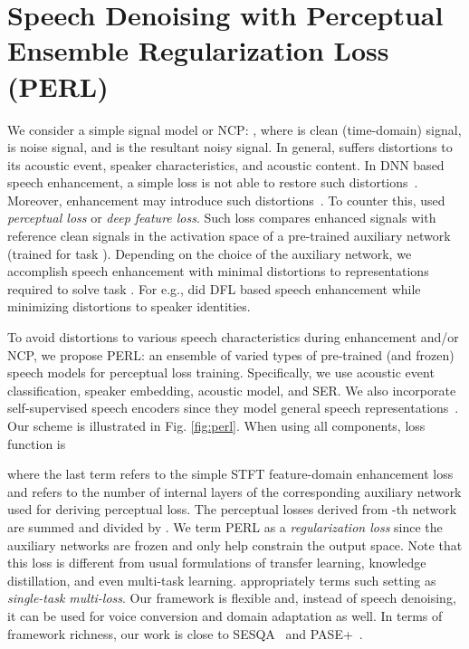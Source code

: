 \documentclass{article}
\begin{document}
\section{Speech Denoising with Perceptual Ensemble Regularization Loss (PERL)}
\label{sec:perl}
We consider a simple signal model or \ac{NCP}: , where  is clean (time-domain) signal,  is noise signal, and  is the resultant noisy signal.
In general,  suffers distortions to its acoustic event, speaker characteristics, and acoustic content.
In \ac{DNN} based speech enhancement, a simple  loss is not able to restore such distortions~\cite{kataria2020analysis}.
Moreover, enhancement may introduce such distortions~\cite{kataria2020analysis}.
To counter this, \cite{germain2018speech,kataria2020analysis} used \emph{perceptual loss} or \emph{deep feature loss}.
Such loss compares enhanced signals with reference clean signals in the activation space of a pre-trained auxiliary network (trained for task ).
Depending on the choice of the auxiliary network, we accomplish speech enhancement with minimal distortions to representations required to solve task .
For e.g., \cite{kataria2020analysis} did \ac{DFL} based speech enhancement while minimizing distortions to speaker identities.

To avoid distortions to various speech characteristics during enhancement and/or \ac{NCP}, we propose \ac{PERL}: an ensemble of varied types of pre-trained (and frozen) speech models for perceptual loss training.
Specifically, we use acoustic event classification, speaker embedding, acoustic model, and \ac{SER}.
We also incorporate self-supervised speech encoders since they model general speech representations~\cite{baevski2020wav2vec}.
Our scheme is illustrated in Fig. \ref{fig:perl}.
When using all components, loss function is

where the last term refers to the simple \ac{STFT} feature-domain  enhancement loss and  refers to the number of internal layers of the corresponding auxiliary network used for deriving perceptual loss.
The perceptual losses derived from -th network are summed and divided by .
We term \ac{PERL} as a \emph{regularization loss} since the auxiliary networks are frozen and only help constrain the output space.
Note that this loss is different from usual formulations of transfer learning, knowledge distillation, and even multi-task learning.
\cite{groenendijk2020multi} appropriately terms such setting as \emph{single-task multi-loss}.
Our framework is flexible and, instead of speech denoising, it can be used for voice conversion and domain adaptation as well.
In terms of framework richness, our work is close to \ac{SESQA}~\cite{serra2020sesqa} and PASE+~\cite{ravanelli2020multi}.
\end{document}
